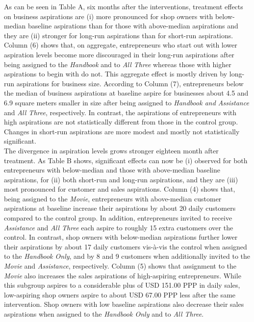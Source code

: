 \documentclass[11.5pt]{article}
\begin{document}
As can be seen in Table A, six months after the interventions, treatment effects on business aspirations are (i) more pronounced for shop owners with below-median baseline aspirations than for those with above-median aspirations and they are (ii) stronger for long-run aspirations than for short-run aspirations. Column (6) shows that, on aggregate, entrepreneurs who start out with lower aspiration levels become more discouraged in their long-run aspirations after being assigned to the \emph{Handbook} and to \emph{All Three} whereas those with higher aspirations to begin with do not. %
This aggregate effect is mostly driven by long-run aspirations for business size. According to Column (7), entrepreneurs below the median of business aspirations at baseline aspire for businesses about 4.5 and 6.9 square meters smaller in size after being assigned to \emph{Handbook and Assistance} and \emph{All Three}, respectively. In contrast, the aspirations of entrepreneurs with high aspirations are not statistically different from those in the control group. Changes in short-run aspirations are more modest and mostly not statistically significant. \\ %

The divergence in aspiration levels grows stronger eighteen month after treatment. As Table B shows, significant effects can now be (i) observed for both entrepreneurs with below-median and those with above-median baseline aspirations, for (ii) both short-run and long-run aspirations, and they are (iii) most pronounced for customer and sales aspirations. Column (4) shows that, being assigned to the \emph{Movie}, entrepreneurs with above-median customer aspirations at baseline increase their aspirations by about 20 daily customers compared to the control group. In addition, entrepreneurs invited to receive \emph{Assistance} and \emph{All Three} each aspire to roughly 15 extra customers over the control. In contrast, shop owners with below-median aspirations further lower their aspirations by about 17 daily customers vis-\`{a}-vis the control when assigned to the \emph{Handbook Only}, and by 8 and 9 customers when additionally invited to the \emph{Movie} and \emph{Assistance}, respectively. Column (5) shows that assignment to the \emph{Movie} also increases the sales aspirations of high-aspiring entrepreneurs. While this subgroup aspires to a considerable plus of USD 151.00 PPP in daily sales, low-aspiring shop owners aspire to about USD 67.00 PPP less after the same intervention. Shop owners with low baseline aspirations also decrease their sales aspirations when assigned to the \emph{Handbook Only} and to \emph{All Three}.
\end{document}
